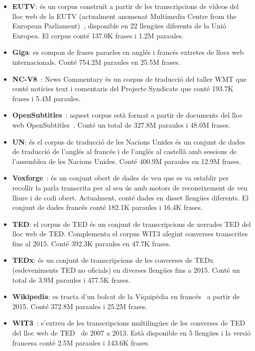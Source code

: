 \begin{itemize}
\item \textbf{EUTV}: és un corpus construït a partir de les transcripcions de vídeos del lloc web de la EUTV (actualment anomenat Multimedia Centre from the European Parliament)~\cite{eutv}, disponible en 22 llengües diferents de la Unió Europea. El corpus conté 137.0K frases i 1.2M paraules.

\item \textbf{Giga}: es compon de frases para\lgem eles en anglés i francés extretes de llocs web internacionals. Conté 754.2M paraules en 25.5M frases.

\item \textbf{NC-V8}~\cite{ncv8}: News Commentary és un corpus de traducció del taller WMT que conté notícies text i comentaris del Projecte Syndicate que conté 193.7K frases i 5.4M paraules.

\item \textbf{OpenSubtitles}~\cite{opensubtitles-article}: aquest corpus està format a partir de documents del lloc web OpenSubtitles~\cite{opensubtitles}. Conté un total de 327.8M paraules i 48.0M frases.

\item \textbf{UN}: és el corpus de traducció de les Nacions Unides és un conjunt de dades de traducció de l'anglés al francés i de l'anglés al castellà amb sessions de l'assemblea de les Nacions Unides. Conté 400.9M paraules en 12.9M frases.

\item \textbf{Voxforge}~\cite{voxforge}: és un conjunt obert de dades de veu que es va establir per recollir la parla transcrita per al seu ús amb motors de reconeixement de veu lliure i de codi obert. Actualment, conté dades en disset llengües diferents. El conjunt de dades francés conté 182.1K paraules i 16.4K frases.

\item \textbf{TED}: el corpus de TED és un conjunt de transcripcions de xerrades TED del lloc web de TED. Complementa el corpus WIT3 afegint converses transcrites fins al 2015. Conté 392.3K paraules en 47.7K frases.

\item \textbf{TEDx}: és un conjunt de transcripcions de les converses de TEDx (esdeveniments TED no oficials) en diverses llengües fins a 2015. Conté un total de 3.9M paraules i 477.5K frases.

\item \textbf{Wikipedia}: es tracta d'un bolcat de la Viquipèdia en francés~\cite{wiki} a partir de 2015. Conté 372.8M paraules i 25.2M frases.

\item \textbf{WIT3}~\cite{wit3}: s'extreu de les transcripcions multilingües de les converses de TED del lloc web de TED~\cite{ted} de 2007 a 2013. Està disponible en 5 llengües i la versió francesa conté 2.5M paraules i 143.6K frases.
\end{itemize}

